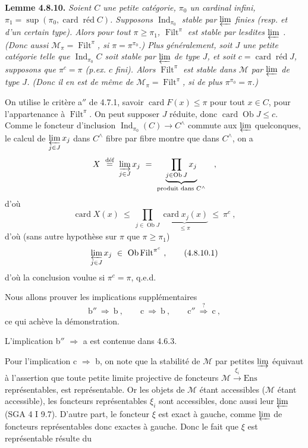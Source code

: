 \documentclass[11pt]{article}
\newcommand{\printedpage}[1]{\marginpar{\footnotesize p.~#1}}
\newcommand{\msp}[1]{\marginpar{\footnotesize [#1]}}
\newcommand{\Ind}{\operatorname{Ind}}
\newcommand{\Filt}{\operatorname{Filt}}
\newcommand{\card}{\operatorname{card}}
\newcommand{\red}{\operatorname{\text{réd}}}
\newcommand{\Ob}{\operatorname{Ob}}
\newcommand{\Ens}{\mathrm{Ens}}
\newcommand{\cM}{\mathcal{M}}
\newcommand{\defeq}{\overset{\text{déf}}{=}}
\begin{document}
\printedpage{74}

\textbf{Lemme 4.8.10.} \textit{Soient $C$ une petite catégorie, $\pi_0$ un cardinal infini, $\pi_1 = \sup(\pi_0, \card\red C)$. Supposons $\Ind_{\pi_0}$ stable par $\varprojlim$ finies (resp. et d'un certain type). Alors pour tout $\pi \geqslant \pi_1$, $\Filt^{\pi}$ est stable par lesdites $\varprojlim$ . (Donc aussi $\cM_{\pi} = \Filt^{\pi}$, si $\pi = \pi^{\pi_0}$.) Plus} %
\msp{page 209}
\textit{généralement, soit $J$ une petite catégorie telle que $\Ind_{\pi_0}C$ soit stable par $\varprojlim$ de type $J$, et soit $c = \card\red J$, supposons que $\pi^{c} = \pi$ (p.ex. $c$ fini). Alors $\Filt^{\pi}$ est stable dans $\cM$ par $\varprojlim$ de type $J$. (Donc il en est de même de $\cM_{\pi} = \Filt^{\pi}$, si de plus $\pi^{\pi_0} = \pi$.)}

On utilise le critère a$''$ de 4.7.1, savoir $\card F(x) \leqslant \pi$ pour tout $x \in C$, pour l'appartenance à $\Filt^{\pi}$. On peut supposer $J$ réduite, donc $\card\Ob J \leqslant c$. Comme le foncteur d'inclusion $\Ind_{\pi_0}(C) \longrightarrow C^{\wedge}$ commute aux $\varprojlim$ quelconques, le calcul de $\varprojlim\limits_{j\in J} x_j$ dans $C^{\wedge}$ fibre par fibre montre que dans $C^{\wedge}$, on a
\[
X \ \defeq\ \varinjlim_{j\in J} x_j \ = \ \underbrace{\prod_{j\in\Ob J} x_j}_{\text{produit dans } C^{\wedge}} \quad ,
\] %
d'où
\[
\card X(x) \ \leqslant\ \prod_{j\in\Ob J} \underbrace{\card x_j(x)}_{\leqslant\pi} \ \leqslant\ \pi^{c}\ ,
\]
d'où (sans autre hypothèse sur $\pi$ que $\pi \geqslant \pi_1$)
\[
\varprojlim_{j\in J} x_j \ \in\ \Ob\Filt^{\pi^{c}}\ , \tag*{(4.8.10.1)}
\]
d'où la conclusion voulue si $\pi^{c} = \pi$, q.e.d.

\msp{page 210}

Nous allons prouver les implications supplémentaires
\[
\text{b}'' \ \Longrightarrow\ \text{b}\ , \qquad \text{c} \ \Longrightarrow\ \text{b}\ , \qquad \text{c}'' \ \overset{?}{\Longrightarrow}\ \text{c}\ ,
\]
ce qui achève la démonstration.

L'implication b$''$ $\Longrightarrow$ a est contenue dans 4.6.3.

Pour l'implication c $\Longrightarrow$ b, on note que la stabilité de $\cM$ par petites $\varinjlim$ équivaut à l'assertion que toute petite limite projective de foncteurs $\cM \xrightarrow{\ \xi_i\ } \Ens$ représentables, est représentable. Or les objets de $\cM$ étant accessibles ($\cM$ étant accessible), les foncteurs représentables $\xi_i$ sont accessibles, donc aussi leur $\varprojlim$ (SGA 4 I 9.7). D'autre part, le foncteur $\xi$ est exact à gauche, comme $\varprojlim$ de foncteurs représentables donc exactes à gauche. Donc le fait que $\xi$ est représentable résulte du %
\end{document}
